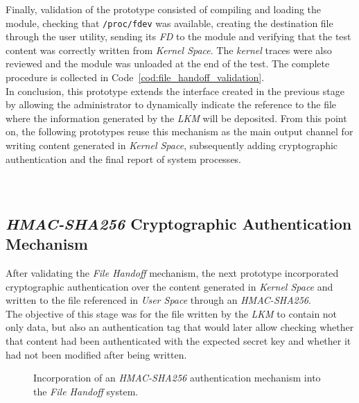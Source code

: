 Finally, validation of the prototype consisted of compiling and loading the module, checking that \texttt{/proc/fdev} was available, creating the destination file through the user utility, sending its \textit{FD} to the module and verifying that the test content was correctly written from \textit{Kernel Space}.
The \textit{kernel} traces were also reviewed and the module was unloaded at the end of the test.
The complete procedure is collected in Code~\ref{cod:file_handoff_validation}.\\

In conclusion, this prototype extends the interface created in the previous stage by allowing the administrator to dynamically indicate the reference to the file where the information generated by the \textit{LKM} will be deposited.
From this point on, the following prototypes reuse this mechanism as the main output channel for writing content generated in \textit{Kernel Space}, subsequently adding cryptographic authentication and the final report of system processes.\\\\

\

\subsection{\textit{HMAC-SHA256} Cryptographic Authentication Mechanism}

After validating the \textit{File Handoff} mechanism, the next prototype incorporated cryptographic authentication over the content generated in \textit{Kernel Space} and written to the file referenced in \textit{User Space} through an \textit{HMAC-SHA256}.\\

The objective of this stage was for the file written by the \textit{LKM} to contain not only data, but also an authentication tag that would later allow checking whether that content had been authenticated with the expected secret key and whether it had not been modified after being written.\\

\newpage

\begin{figure}[h!]
  \centering
  \scalebox{1}{}
  \caption{Incorporation of an \textit{HMAC-SHA256} authentication mechanism into the \textit{File Handoff} system.}
  \label{fig:crypto_hmac_scheme}
\end{figure}

